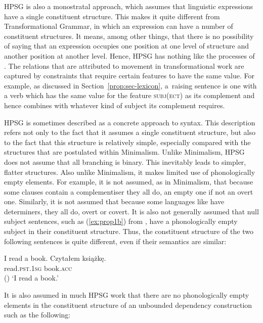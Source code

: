 \documentclass[output=paper,biblatex,babelshorthands,newtxmath,draftmode,colorlinks,citecolor=brown]{langscibook}
\begin{document}
\largerpage[1.5]
HPSG is also a monostratal approach, which assumes that linguistic expressions have a single
constituent structure. This makes it quite different from Transformational Grammar, in which an
expression can have a number of constituent structures. It means, among other things, that there is
no possibility of saying that an expression occupies one position at one level of structure and
another position at another level. Hence, HPSG has nothing like the  processes of
. The relations that are attributed to movement in transformational work are
captured by constraints that require certain features to have the same value. For example, as
discussed in Section~\ref{prop:sec-lexicon}, a~raising sentence is one with a verb which has the
same value for the feature \textsc{subj(ect)} as its complement and hence combines with whatever
kind of subject its complement requires. 

HPSG is sometimes described as a concrete approach to syntax. This description refers not only to
the fact that it assumes a single constituent structure, but also to the fact that this structure is
relatively simple, especially compared with the structures that are postulated within
Minimalism\indexmp. Unlike Minimalism, HPSG does not assume that all branching
is binary. This inevitably leads to simpler, flatter structures. Also unlike Minimalism, it makes
limited use of phonologically empty elements. For example, it is not assumed, as in Minimalism, that
because some clauses contain a complementiser they all do, an empty one if not an overt
one. Similarly, it is not assumed that because some languages like  have determiners, they
all do, overt or covert. It is also not generally assumed that null subject sentences, such as
(\ref{ex:prop1b}) from , have a phonologically empty subject in their constituent
structure. Thus, the constituent structure of the two following sentences is quite different, even
if their semantics are similar:

\eal\label{ex:prop1}
\ex\label{ex:prop1a}
I read a book.
\ex\label{ex:prop1b}
\gll Czytałem książkę.\\
     read\textsc{.pst.1sg} book\textsc{.acc}\\\hfill()
\glt `I read a book.'
\zl

\noindent
It is also assumed in much HPSG work that there are no phonologically empty elements in the
constituent structure of an unbounded dependency construction such as the following:
\end{document}
